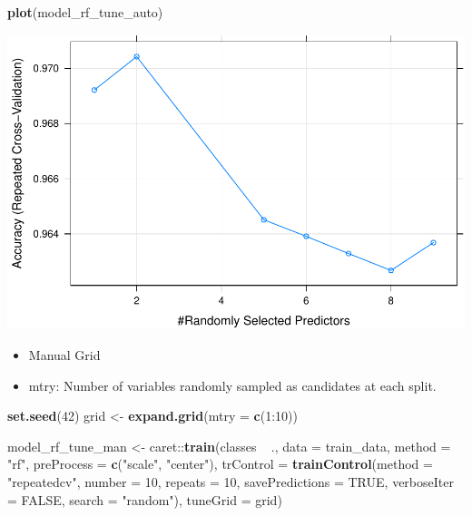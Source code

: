 \documentclass[]{article}
\newenvironment{Shaded}{\begin{snugshade}}{\end{snugshade}}
\newcommand{\KeywordTok}[1]{\textcolor[rgb]{0.13,0.29,0.53}{\textbf{{#1}}}}
\newcommand{\DataTypeTok}[1]{\textcolor[rgb]{0.13,0.29,0.53}{{#1}}}
\newcommand{\DecValTok}[1]{\textcolor[rgb]{0.00,0.00,0.81}{{#1}}}
\newcommand{\StringTok}[1]{\textcolor[rgb]{0.31,0.60,0.02}{{#1}}}
\newcommand{\OtherTok}[1]{\textcolor[rgb]{0.56,0.35,0.01}{{#1}}}
\newcommand{\NormalTok}[1]{{#1}}
\begin{document}
\begin{Shaded}
\begin{Highlighting}[]
\KeywordTok{plot}\NormalTok{(model_rf_tune_auto)}
\end{Highlighting}
\end{Shaded}

\includegraphics{webinar_code_files/figure-latex/unnamed-chunk-37-1.pdf}

\begin{itemize}
\item
  Manual Grid
\item
  mtry: Number of variables randomly sampled as candidates at each
  split.
\end{itemize}

\begin{Shaded}
\begin{Highlighting}[]
\KeywordTok{set.seed}\NormalTok{(}\DecValTok{42}\NormalTok{)}
\NormalTok{grid <-}\StringTok{ }\KeywordTok{expand.grid}\NormalTok{(}\DataTypeTok{mtry =} \KeywordTok{c}\NormalTok{(}\DecValTok{1}\NormalTok{:}\DecValTok{10}\NormalTok{))}

\NormalTok{model_rf_tune_man <-}\StringTok{ }\NormalTok{caret::}\KeywordTok{train}\NormalTok{(classes ~}\StringTok{ }\NormalTok{.,}
                         \DataTypeTok{data =} \NormalTok{train_data,}
                         \DataTypeTok{method =} \StringTok{"rf"}\NormalTok{,}
                         \DataTypeTok{preProcess =} \KeywordTok{c}\NormalTok{(}\StringTok{"scale"}\NormalTok{, }\StringTok{"center"}\NormalTok{),}
                         \DataTypeTok{trControl =} \KeywordTok{trainControl}\NormalTok{(}\DataTypeTok{method =} \StringTok{"repeatedcv"}\NormalTok{, }
                                                  \DataTypeTok{number =} \DecValTok{10}\NormalTok{, }
                                                  \DataTypeTok{repeats =} \DecValTok{10}\NormalTok{, }
                                                  \DataTypeTok{savePredictions =} \OtherTok{TRUE}\NormalTok{, }
                                                  \DataTypeTok{verboseIter =} \OtherTok{FALSE}\NormalTok{,}
                                                  \DataTypeTok{search =} \StringTok{"random"}\NormalTok{),}
                         \DataTypeTok{tuneGrid =} \NormalTok{grid)}
\end{Highlighting}
\end{Shaded}
\end{document}
